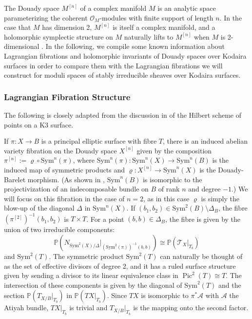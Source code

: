 \documentclass{article}[12pt]
\theoremstyle{definition}
\theoremstyle{remark}
\numberwithin{equation}{section}
\newcommand \mc{\mathcal}
\newcommand \mb{\mathbb}
\DeclareMathOperator{\Pic}{Pic}
\begin{document}
The Douady space $M^{[n]}$ of a complex manifold $M$ is an analytic space parameterizing the coherent $\mc{O}_M$-modules with finite support of length $n$. In the case that $M$ has dimension 2, $M^{[n]}$ is itself a complex manifold, and a holomorphic symplectic structure on $M$ naturally lifts to $M^{[n]}$ when $M$ is 2-dimensional \cite{Beau}. In the following, we compile some known information about Lagrangian fibrations and holomorphic invariants of Douady spaces over Kodaira surfaces in order to compare them with the Lagrangian fibrations we will construct for moduli spaces of stably irreducible sheaves over Kodaira surfaces.

\subsubsection{Lagrangian Fibration Structure}
The following is closely adapted from the discussion in \cite{Lehn} of the Hilbert scheme of points on a K3 surface.

If $\pi:X \to B$ is a principal elliptic surface with fibre $T$, there is an induced abelian variety fibration on the Douady space $X^{[n]}$ given by the composition $\pi^{[n]}:=\varrho\circ \text{Sym}^n(\pi)$, where $\text{Sym}^n(\pi):\text{Sym}^n(X)\to \text{Sym}^n(B)$ is the induced map of symmetric products and $\varrho:X^{[n]}\to \text{Sym}^n(X)$ is the Douady-Barelet morphism. (As shown in \cite{CatCil}, $\text{Sym}^n(B)$ is isomorphic to the projectivization of an indecomposable bundle on $B$ of rank $n$ and degree $-1$.) We will focus on this fibration in the case of $n=2$, as in this case $\varrho$ is simply the blow-up of the diagonal $\Delta$ in $\text{Sym}^n(X)$. If $(b_1,b_2) \in \text{Sym}^2(B)\setminus \Delta_B$, the fibre $(\pi^{[2]})^{-1}(b_1,b_2)$ is  $T\times T$. For a point $(b,b) \in \Delta_B$, the fibre is given by the union of two irreducible components: $$\mb{P}(N_{\text{Sym}^2(X)/\Delta}|_{(\text{Sym}^2(\pi))^{-1}(b,b)})\cong \mb{P}(\mc{T}_X|_{T_b})$$ and $\text{Sym}^2(T)$. The symmetric product $\text{Sym}^2(T)$ can naturally be thought of as the set of effective divisors of degree 2, and it has a ruled surface structure given by sending a divisor to its linear equivalence class in $\Pic^2(T)\cong T$. The intersection of these components is given by the diagonal of $\text{Sym}^2(T)$ and the section $\mb{P}(T_{X/B}|_{T_b})$ in $\mb{P}(TX|_{T_b})$. Since $TX$ is isomorphic to $\pi^*\mc{A}$ with $\mc{A}$ the Atiyah bundle, $TX|_{T_b}$ is trivial and $T_{X/B}|_{T_b}$ is the mapping onto the second factor.
\end{document}
